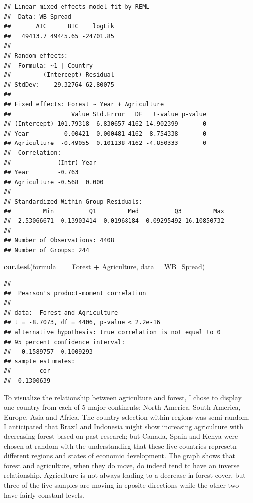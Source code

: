 \documentclass[12pt,]{article}
\newenvironment{Shaded}{\begin{snugshade}}{\end{snugshade}}
\newcommand{\KeywordTok}[1]{\textcolor[rgb]{0.13,0.29,0.53}{\textbf{#1}}}
\newcommand{\DataTypeTok}[1]{\textcolor[rgb]{0.13,0.29,0.53}{#1}}
\newcommand{\StringTok}[1]{\textcolor[rgb]{0.31,0.60,0.02}{#1}}
\newcommand{\CommentTok}[1]{\textcolor[rgb]{0.56,0.35,0.01}{\textit{#1}}}
\newcommand{\OperatorTok}[1]{\textcolor[rgb]{0.81,0.36,0.00}{\textbf{#1}}}
\newcommand{\NormalTok}[1]{#1}
\begin{document}
\begin{verbatim}
## Linear mixed-effects model fit by REML
##  Data: WB_Spread 
##       AIC      BIC    logLik
##   49413.7 49445.65 -24701.85
## 
## Random effects:
##  Formula: ~1 | Country
##         (Intercept) Residual
## StdDev:    29.32764 62.80075
## 
## Fixed effects: Forest ~ Year + Agriculture 
##                 Value Std.Error   DF   t-value p-value
## (Intercept) 101.79318  6.830657 4162 14.902399       0
## Year         -0.00421  0.000481 4162 -8.754338       0
## Agriculture  -0.49055  0.101138 4162 -4.850333       0
##  Correlation: 
##             (Intr) Year  
## Year        -0.763       
## Agriculture -0.568  0.000
## 
## Standardized Within-Group Residuals:
##         Min          Q1         Med          Q3         Max 
## -2.53066671 -0.13903414 -0.01968184  0.09295492 16.10850732 
## 
## Number of Observations: 4408
## Number of Groups: 244
\end{verbatim}

\begin{Shaded}
\begin{Highlighting}[]
\KeywordTok{cor.test}\NormalTok{(}\DataTypeTok{formula =} \OperatorTok{~}\StringTok{ }\NormalTok{Forest }\OperatorTok{+}\StringTok{ }\NormalTok{Agriculture,}
         \DataTypeTok{data =}\NormalTok{ WB_Spread)}
\end{Highlighting}
\end{Shaded}

\begin{verbatim}
## 
##  Pearson's product-moment correlation
## 
## data:  Forest and Agriculture
## t = -8.7073, df = 4406, p-value < 2.2e-16
## alternative hypothesis: true correlation is not equal to 0
## 95 percent confidence interval:
##  -0.1589757 -0.1009293
## sample estimates:
##        cor 
## -0.1300639
\end{verbatim}

\begin{Shaded}
\end{Shaded}

To visualize the relationship between agriculture and forest, I chose to
display one country from each of 5 major continents: North America,
South America, Europe, Asia and Africa. The country selection within
regions was semi-random. I anticipated that Brazil and Indonesia might
show increasing agriculture with decreasing forest based on past
research; but Canada, Spain and Kenya were chosen at random with the
understanding that these five countries represetn different regions and
states of economic development. The graph shows that forest and
agriculture, when they do move, do indeed tend to have an inverse
relationship. Agriculture is not always leading to a decrease in forest
cover, but three of the five samples are moving in oposite directions
while the other two have fairly constant levels.
\end{document}
